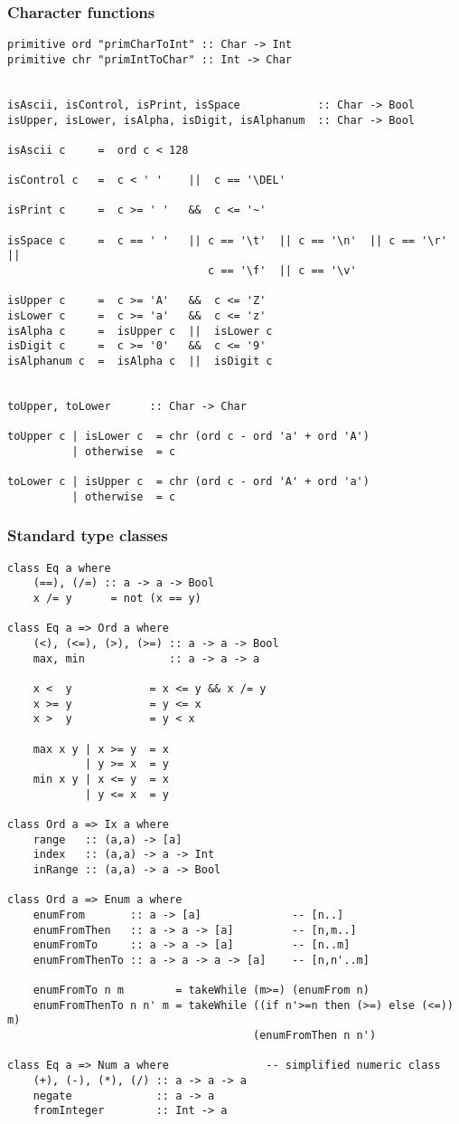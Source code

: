 \subsubsection*{Character functions}
\begin{verbatim}
primitive ord "primCharToInt" :: Char -> Int
primitive chr "primIntToChar" :: Int -> Char


isAscii, isControl, isPrint, isSpace            :: Char -> Bool
isUpper, isLower, isAlpha, isDigit, isAlphanum  :: Char -> Bool

isAscii c     =  ord c < 128

isControl c   =  c < ' '    ||  c == '\DEL'

isPrint c     =  c >= ' '   &&  c <= '~'

isSpace c     =  c == ' '   || c == '\t'  || c == '\n'  || c == '\r'  ||
                               c == '\f'  || c == '\v'

isUpper c     =  c >= 'A'   &&  c <= 'Z'
isLower c     =  c >= 'a'   &&  c <= 'z'
isAlpha c     =  isUpper c  ||  isLower c
isDigit c     =  c >= '0'   &&  c <= '9'
isAlphanum c  =  isAlpha c  ||  isDigit c


toUpper, toLower      :: Char -> Char

toUpper c | isLower c  = chr (ord c - ord 'a' + ord 'A')
          | otherwise  = c

toLower c | isUpper c  = chr (ord c - ord 'A' + ord 'a')
          | otherwise  = c
\end{verbatim}
\subsubsection*{Standard type classes}
\begin{verbatim}
class Eq a where
    (==), (/=) :: a -> a -> Bool
    x /= y      = not (x == y)

class Eq a => Ord a where
    (<), (<=), (>), (>=) :: a -> a -> Bool
    max, min             :: a -> a -> a

    x <  y            = x <= y && x /= y
    x >= y            = y <= x
    x >  y            = y < x

    max x y | x >= y  = x
            | y >= x  = y
    min x y | x <= y  = x
            | y <= x  = y

class Ord a => Ix a where
    range   :: (a,a) -> [a]
    index   :: (a,a) -> a -> Int
    inRange :: (a,a) -> a -> Bool

class Ord a => Enum a where
    enumFrom       :: a -> [a]              -- [n..]
    enumFromThen   :: a -> a -> [a]         -- [n,m..]
    enumFromTo     :: a -> a -> [a]         -- [n..m]
    enumFromThenTo :: a -> a -> a -> [a]    -- [n,n'..m]

    enumFromTo n m        = takeWhile (m>=) (enumFrom n)
    enumFromThenTo n n' m = takeWhile ((if n'>=n then (>=) else (<=)) m)
                                      (enumFromThen n n')

class Eq a => Num a where               -- simplified numeric class
    (+), (-), (*), (/) :: a -> a -> a
    negate             :: a -> a
    fromInteger	       :: Int -> a
\end{verbatim}
